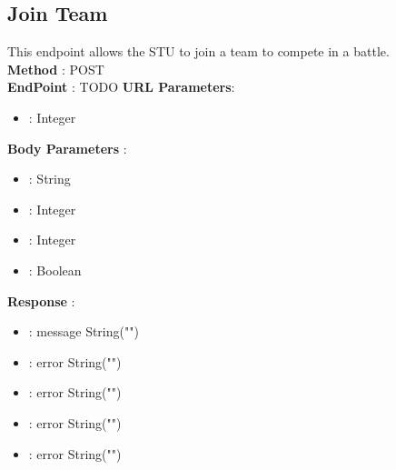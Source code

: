 \subsection*{Join Team}
This endpoint allows the STU to join a team to compete in a battle.\\
\textbf{Method} : POST \\
\textbf{EndPoint} : {\color{blue} TODO}
\textbf{URL Parameters}:
\begin{itemize}
    \item {} : Integer
\end{itemize}
\textbf{Body Parameters} :
\begin{itemize}
    \item {} : String  
    \item {} : Integer  
    \item {} : Integer  
    \item {} : Boolean 
\end{itemize}
\textbf{Response} :
\begin{itemize}
    \item {} : message String("")
    \item {} : error String("")
    \item {} : error String("")
    \item {} : error String("")
    \item {} : error String("")
\end{itemize}

\newpage

